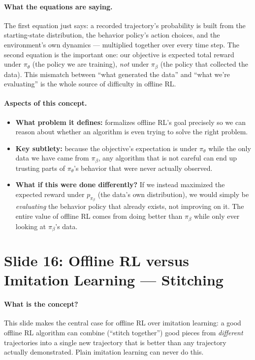 \documentclass[11pt]{article}
\begin{document}
\paragraph{What the equations are saying.}
The first equation just says: a recorded trajectory's probability is built from the
starting-state distribution, the behavior policy's action choices, and the environment's
own dynamics --- multiplied together over every time step. The second equation is the
important one: our objective is expected total reward under $\pi_\theta$ (the policy we
are training), \emph{not} under $\pi_\beta$ (the policy that collected the data). This
mismatch between ``what generated the data'' and ``what we're evaluating'' is the whole
source of difficulty in offline RL.

\paragraph{Aspects of this concept.}
\begin{itemize}
\item \textbf{What problem it defines:} formalizes offline RL's goal precisely so we can
reason about whether an algorithm is even trying to solve the right problem.
\item \textbf{Key subtlety:} because the objective's expectation is under $\pi_\theta$
while the only data we have came from $\pi_\beta$, any algorithm that is not careful can
end up trusting parts of $\pi_\theta$'s behavior that were never actually observed.
\item \textbf{What if this were done differently?} If we instead maximized the expected
reward under $p_{\pi_\beta}$ (the data's own distribution), we would simply be
\emph{evaluating} the behavior policy that already exists, not improving on it. The
entire value of offline RL comes from doing better than $\pi_\beta$ while only ever
looking at $\pi_\beta$'s data.
\end{itemize}

\section{Slide 16: Offline RL versus Imitation Learning --- Stitching}

\paragraph{What is the concept?}
This slide makes the central case for offline RL over imitation learning: a good offline
RL algorithm can combine (``stitch together'') good pieces from \emph{different}
trajectories into a single new trajectory that is better than any trajectory actually
demonstrated. Plain imitation learning can never do this.
\end{document}
